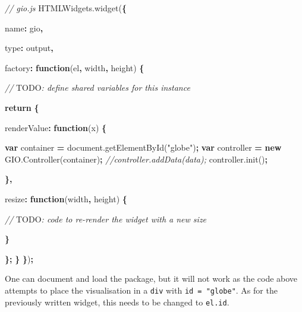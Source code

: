 \documentclass[
]{krantz}
\makeatletter
\newenvironment{Shaded}{\begin{snugshade}}{\end{snugshade}}
\newcommand{\AlertTok}[1]{\textcolor[rgb]{0.33,0.33,0.33}{#1}}
\newcommand{\AttributeTok}[1]{\textcolor[rgb]{0.61,0.61,0.61}{#1}}
\newcommand{\CommentTok}[1]{\textcolor[rgb]{0.37,0.37,0.37}{\textit{#1}}}
\newcommand{\ControlFlowTok}[1]{\textcolor[rgb]{0.27,0.27,0.27}{\textbf{#1}}}
\newcommand{\DataTypeTok}[1]{\textcolor[rgb]{0.27,0.27,0.27}{#1}}
\newcommand{\KeywordTok}[1]{\textcolor[rgb]{0.27,0.27,0.27}{\textbf{#1}}}
\newcommand{\NormalTok}[1]{#1}
\newcommand{\OperatorTok}[1]{\textcolor[rgb]{0.43,0.43,0.43}{\textbf{#1}}}
\newcommand{\StringTok}[1]{\textcolor[rgb]{0.5,0.5,0.5}{#1}}
\newcommand{\VariableTok}[1]{\textcolor[rgb]{0,0,0}{#1}}
\newenvironment{kframe}{%
\medskip{}
\setlength{\fboxsep}{.8em}
 \def\at@end@of@kframe{}%
 \ifinner\ifhmode%
  \def\at@end@of@kframe{\end{minipage}}%
  \begin{minipage}{\columnwidth}%
 \fi\fi%
 \def\FrameCommand##1{\hskip\@totalleftmargin \hskip-\fboxsep
 \colorbox{shadecolor}{##1}\hskip-\fboxsep
     \hskip-\linewidth \hskip-\@totalleftmargin \hskip\columnwidth}%
 \MakeFramed {\advance\hsize-\width
   \@totalleftmargin\z@ \linewidth\hsize
   \@setminipage}}%
 {\par\unskip\endMakeFramed%
 \at@end@of@kframe}
\renewenvironment{Shaded}{\begin{kframe}}{\end{kframe}}
\makeatother
\begin{document}
\begin{Shaded}
\begin{Highlighting}[]
\CommentTok{// gio.js}
\VariableTok{HTMLWidgets}\NormalTok{.}\AttributeTok{widget}\NormalTok{(}\OperatorTok{\{}

  \DataTypeTok{name}\OperatorTok{:} \StringTok{\textquotesingle{}gio\textquotesingle{}}\OperatorTok{,}

  \DataTypeTok{type}\OperatorTok{:} \StringTok{\textquotesingle{}output\textquotesingle{}}\OperatorTok{,}

  \DataTypeTok{factory}\OperatorTok{:} \KeywordTok{function}\NormalTok{(el}\OperatorTok{,}\NormalTok{ width}\OperatorTok{,}\NormalTok{ height) }\OperatorTok{\{}

    \CommentTok{// }\AlertTok{TODO}\CommentTok{: define shared variables for this instance}

    \ControlFlowTok{return} \OperatorTok{\{}

      \DataTypeTok{renderValue}\OperatorTok{:} \KeywordTok{function}\NormalTok{(x) }\OperatorTok{\{}

        \KeywordTok{var}\NormalTok{ container }\OperatorTok{=} \VariableTok{document}\NormalTok{.}\AttributeTok{getElementById}\NormalTok{(}\StringTok{"globe"}\NormalTok{)}\OperatorTok{;}
        \KeywordTok{var}\NormalTok{ controller }\OperatorTok{=} \KeywordTok{new} \VariableTok{GIO}\NormalTok{.}\AttributeTok{Controller}\NormalTok{(container)}\OperatorTok{;}
        \CommentTok{//controller.addData(data);}
        \VariableTok{controller}\NormalTok{.}\AttributeTok{init}\NormalTok{()}\OperatorTok{;}

      \OperatorTok{\},}

      \DataTypeTok{resize}\OperatorTok{:} \KeywordTok{function}\NormalTok{(width}\OperatorTok{,}\NormalTok{ height) }\OperatorTok{\{}

        \CommentTok{// }\AlertTok{TODO}\CommentTok{: code to re{-}render the widget with a new size}

      \OperatorTok{\}}

    \OperatorTok{\};}
  \OperatorTok{\}}
\OperatorTok{\}}\NormalTok{)}\OperatorTok{;}
\end{Highlighting}
\end{Shaded}

One can document and load the package, but it will not work as the code above attempts to place the visualisation in a \texttt{div} with \texttt{id\ =\ "globe"}. As for the previously written widget, this needs to be changed to \texttt{el.id}.
\end{document}
